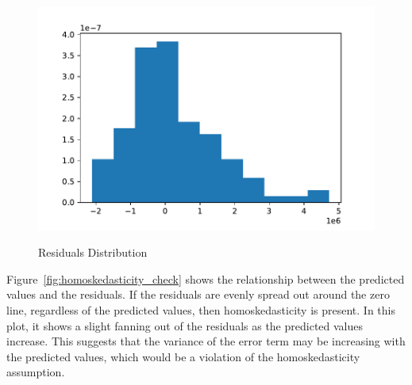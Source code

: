 \documentclass[12pt]{article}
\begin{document}
\begin{figure}[h!]
    \caption{Residuals Distribution}
    \includegraphics[width=1\textwidth]{residuals_distribution.pdf}
    \label{fig:residuals_distribution}

\end{figure}
Figure~\ref{fig:homoskedasticity_check} shows the relationship between the predicted values and the residuals. If the residuals are evenly spread out around the zero line, regardless of the predicted values, then homoskedasticity is present. In this plot, it shows a slight fanning out of the residuals as the predicted values increase. This suggests that the variance of the error term may be increasing with the predicted values, which would be a violation of the homoskedasticity assumption. 
\end{document}
